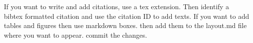 If you want to write and add citations, use a tex extension. Then identify a bibtex formatted citation and use the citation ID to add texts. 
If you want to add tables and figures then use markdown boxes. 
then add them to the layout.md file where you want to appear. 
commit the changes. 
